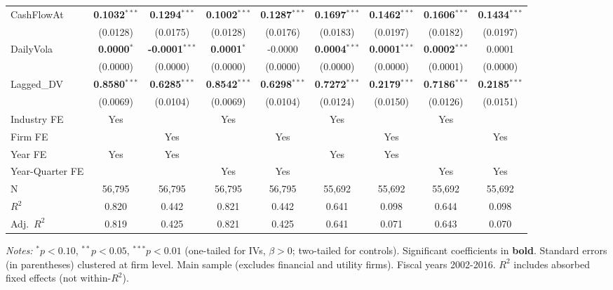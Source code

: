 \documentclass[11pt,a4paper]{article}
\begin{document}
\begin{table}[htbp]
\begin{tabular}{lcccccccc}
CashFlowAt & \textbf{0.1032}$^{***}$ & \textbf{0.1294}$^{***}$ & \textbf{0.1002}$^{***}$ & \textbf{0.1287}$^{***}$ & \textbf{0.1697}$^{***}$ & \textbf{0.1462}$^{***}$ & \textbf{0.1606}$^{***}$ & \textbf{0.1434}$^{***}$ \\
 & (0.0128) & (0.0175) & (0.0128) & (0.0176) & (0.0183) & (0.0197) & (0.0182) & (0.0197) \\
DailyVola & \textbf{0.0000}$^{*}$ & \textbf{-0.0001}$^{***}$ & \textbf{0.0001}$^{*}$ & -0.0000 & \textbf{0.0004}$^{***}$ & \textbf{0.0001}$^{***}$ & \textbf{0.0002}$^{***}$ & 0.0001 \\
 & (0.0000) & (0.0000) & (0.0000) & (0.0000) & (0.0000) & (0.0000) & (0.0001) & (0.0000) \\
Lagged\_DV & \textbf{0.8580}$^{***}$ & \textbf{0.6285}$^{***}$ & \textbf{0.8542}$^{***}$ & \textbf{0.6298}$^{***}$ & \textbf{0.7272}$^{***}$ & \textbf{0.2179}$^{***}$ & \textbf{0.7186}$^{***}$ & \textbf{0.2185}$^{***}$ \\
 & (0.0069) & (0.0104) & (0.0069) & (0.0104) & (0.0124) & (0.0150) & (0.0126) & (0.0151) \\
\midrule
Industry FE & Yes &  & Yes &  & Yes &  & Yes &  \\
Firm FE &  & Yes &  & Yes &  & Yes &  & Yes \\
Year FE & Yes & Yes &  &  & Yes & Yes &  &  \\
Year-Quarter FE &  &  & Yes & Yes &  &  & Yes & Yes \\
\midrule
N & 56,795 & 56,795 & 56,795 & 56,795 & 55,692 & 55,692 & 55,692 & 55,692 \\
$R^2$ & 0.820 & 0.442 & 0.821 & 0.442 & 0.641 & 0.098 & 0.644 & 0.098 \\
Adj.~$R^2$ & 0.819 & 0.425 & 0.821 & 0.425 & 0.641 & 0.071 & 0.643 & 0.070 \\
\bottomrule
\end{tabular}
\begin{minipage}{\linewidth}
\vspace{2pt}\scriptsize
\textit{Notes:} $^{*}p<0.10$, $^{**}p<0.05$, $^{***}p<0.01$ (one-tailed for IVs, $\beta > 0$; two-tailed for controls).
 Significant coefficients in \textbf{bold}.
 Standard errors (in parentheses) clustered at firm level.
 Main sample (excludes financial and utility firms). Fiscal years 2002-2016.
 $R^2$ includes absorbed fixed effects (not within-$R^2$).
\end{minipage}
\end{table}
\clearpage
\end{document}

